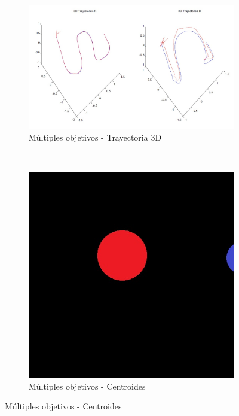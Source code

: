 \begin{figure}[hp]
	\centering
	\begin{subfigure}{0.45\linewidth}
		\centering
		\includegraphics[width=\linewidth]{../Images/c3/sim4_3dtraj}
		\caption{M\'ultiples objetivos - Trayectoria 3D}
		\label{fig:sim4_3dtraj}
	\end{subfigure}
	~
	\begin{subfigure}{0.2\linewidth}
		\centering
		\includegraphics[width=\linewidth]{../Images/c3/sims_two_object_centroid_out}
		\caption{M\'ultiples objetivos - Centroides}
		\label{fig:sim4_centroid_objs}
	\end{subfigure}
\end{figure}